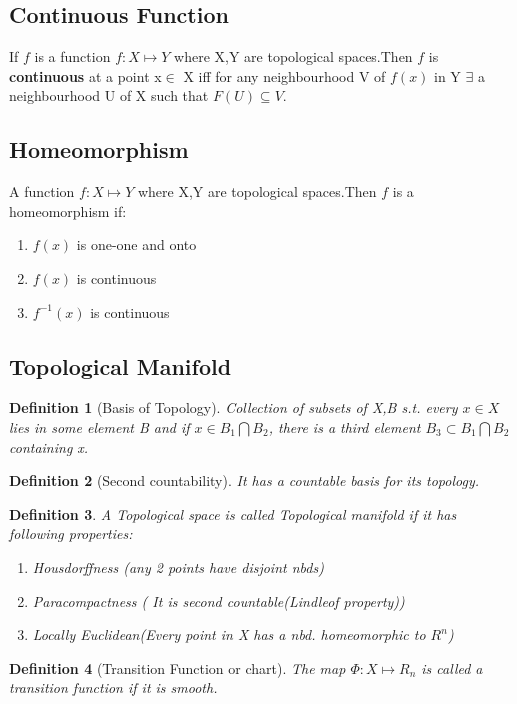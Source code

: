 \documentclass{article}
\newtheorem{defn}{Definition}[section]
\begin{document}
\subsection{Continuous Function }
If $f$ is a function $f:X \mapsto Y$ where X,Y are topological spaces.Then $f$ is \textbf{continuous} at a point x$\in$ X iff for  any neighbourhood V of $f(x)$ in Y $\exists$ a neighbourhood U of X such that $F(U) \subseteq V$.  

\subsection{Homeomorphism}
A function $f:X \mapsto Y$ where X,Y are topological spaces.Then $f$ is a homeomorphism if:
\begin{enumerate}
    \item $f(x)$ is one-one and onto 
    \item $f(x)$ is continuous 
    \item $f^{-1}(x)$ is continuous
\end{enumerate}


\subsection{Topological Manifold}
\begin{defn}[Basis of Topology]
    Collection of subsets of X,B s.t. every $x\in X$ lies in some element B and if $x \in B_1 \bigcap B_2$, there is a third element $B_3 \subset B_1 \bigcap B_2$ containing x. 
\end{defn}
\begin{defn}[Second countability]
    It has a countable basis for its topology. 
\end{defn}
\begin{defn}
    A Topological space is called Topological manifold if it has following properties:
    \begin{enumerate}
        \item Housdorffness (any 2 points have disjoint nbds)
        \item Paracompactness ( It is second countable(Lindleof property))
        \item Locally Euclidean(Every point in X has a nbd. homeomorphic to $R^n$)
    \end{enumerate}
        
\end{defn}

\begin{defn}[Transition Function or chart]
    The map $\varPhi : X\mapsto R_n $ is called a transition function if it is smooth.

\end{defn}
\end{document}
